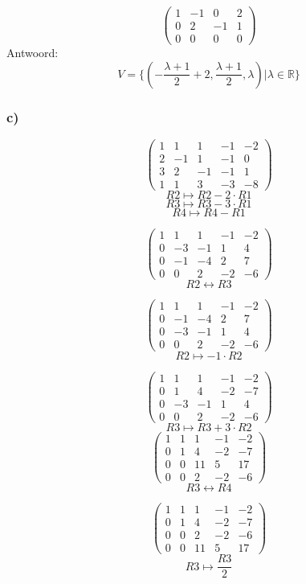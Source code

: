 \documentclass[lineaire_algebra_oplossingen.tex]{subfiles}
\begin{document}
\[
\begin{pmatrix}
1 & -1 & 0 & 2\\
0 & 2 & -1 & 1\\
0 & 0 & 0 & 0
\end{pmatrix}
\]
Antwoord:
\[
V = \{(-\frac{\lambda+1}{2} + 2,\frac{\lambda+1}{2},\lambda) | \lambda \in \mathbb{R}\}
\]

\subsubsection*{c)}
\[
\begin{pmatrix}
1 & 1 & 1 &-1&-2\\
2 & -1 & 1 & -1 & 0\\
3 & 2 & -1 & -1 & 1\\
1 & 1 & 3 & -3 & -8
\end{pmatrix}
\]
\[ R2 \longmapsto R2 - 2\cdot R1\]
\[ R3 \longmapsto R3 - 3\cdot R1\]
\[ R4 \longmapsto R4 - R1\]

\[
\begin{pmatrix}
1 & 1 & 1 & -1 & -2\\
0 & -3 & -1 & 1 & 4\\
0 & -1 & -4 & 2 & 7\\
0 & 0 & 2 & -2 & -6
\end{pmatrix}
\]
\[ R2 \leftrightarrow R3\]

\[
\begin{pmatrix}
1 & 1 & 1 & -1 & -2\\
0 & -1 & -4 & 2 & 7\\
0 & -3 & -1 & 1 & 4\\
0 & 0 & 2 & -2 & -6
\end{pmatrix}
\]
\[ R2 \longmapsto  -1\cdot R2\]

\[
\begin{pmatrix}
1 & 1 & 1 & -1 & -2\\
0 & 1 & 4 & -2 & -7\\
0 & -3 & -1 & 1 & 4\\
0 & 0 & 2 & -2 & -6
\end{pmatrix}
\]
\[ R3 \longmapsto R3 + 3\cdot R2\]
\[
\begin{pmatrix}
1 & 1 & 1 & -1 & -2\\
0 & 1 & 4 & -2 & -7\\
0 & 0 & 11 & 5 & 17\\
0 & 0 & 2 & -2 & -6
\end{pmatrix}
\]
\[ R3 \leftrightarrow R4\]

\[
\begin{pmatrix}
1 & 1 & 1 & -1 & -2\\
0 & 1 & 4 & -2 & -7\\
0 & 0 & 2 & -2 & -6\\
0 & 0 & 11 & 5 & 17
\end{pmatrix}
\]
\[ R3 \longmapsto  \frac{R3}{2}
\]
\end{document}
